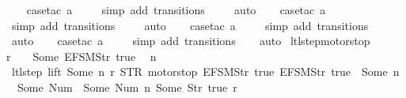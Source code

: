 \begin{isabellebody}
\ \ \isamarkupfalse%
\ {\isacharparenleft}case{\isacharunderscore}tac\ {\isachardoublequoteopen}a{\isacharequal}{}{\isachardoublequoteclose}{\isacharparenright}\isanewline
\ \ \ \isamarkupfalse%
\ {\isacharparenleft}simp\ add{\isacharcolon}\ transitions{\isacharparenright}\isanewline
\ \ \ \isamarkupfalse%
\ auto{\isacharbrackleft}{}{\isacharbrackright}\isanewline
\ \ \isamarkupfalse%
\ {\isacharparenleft}case{\isacharunderscore}tac\ {\isachardoublequoteopen}a{\isacharequal}{}{\isachardoublequoteclose}{\isacharparenright}\isanewline
\ \ \ \isamarkupfalse%
\ {\isacharparenleft}simp\ add{\isacharcolon}\ transitions{\isacharparenright}\isanewline
\ \ \ \isamarkupfalse%
\ auto{\isacharbrackleft}{}{\isacharbrackright}\isanewline
\ \ \isamarkupfalse%
\ {\isacharparenleft}case{\isacharunderscore}tac\ {\isachardoublequoteopen}a{\isacharequal}{}{\isachardoublequoteclose}{\isacharparenright}\isanewline
\ \ \ \isamarkupfalse%
\ {\isacharparenleft}simp\ add{\isacharcolon}\ transitions{\isacharparenright}\isanewline
\ \ \ \isamarkupfalse%
\ auto{\isacharbrackleft}{}{\isacharbrackright}\isanewline
\ \ \isamarkupfalse%
\ {\isacharparenleft}case{\isacharunderscore}tac\ {\isachardoublequoteopen}a{\isacharequal}{}{\isachardoublequoteclose}{\isacharparenright}\isanewline
\ \ \ \isamarkupfalse%
\ {\isacharparenleft}simp\ add{\isacharcolon}\ transitions{\isacharparenright}\isanewline
\ \ \isamarkupfalse%
\ auto%
\endisatagproof
{\isafoldproof}%
%
\isadelimproof
\isanewline
%
\endisadelimproof
\isanewline
{}\isamarkupfalse%
\ ltl{\isacharunderscore}step{\isacharunderscore}motorstop{\isacharcolon}\isanewline
{\isachardoublequoteopen}r\ {\isachardollar}\ {}\ {\isacharequal}\ Some\ {\isacharparenleft}EFSM{\isachardot}Str\ {\isacharprime}{\isacharprime}true{\isacharprime}{\isacharprime}{\isacharparenright}\ {\isasymLongrightarrow}\isanewline
\ n\ {\isasymin}\ {\isacharbraceleft}{}{\isacharcomma}\ {}{\isacharcomma}\ {}{\isacharcomma}\ {}{\isacharbraceright}\ {\isasymLongrightarrow}\isanewline
\ ltl{\isacharunderscore}step\ lift\ {\isacharparenleft}Some\ n{\isacharparenright}\ r\ {\isacharparenleft}STR\ {\isacharprime}{\isacharprime}motorstop{\isacharprime}{\isacharprime}{\isacharcomma}\ {\isacharbrackleft}EFSM{\isachardot}Str\ {\isacharprime}{\isacharprime}true{\isacharprime}{\isacharprime}{\isacharcomma}\ EFSM{\isachardot}Str\ {\isacharprime}{\isacharprime}true{\isacharprime}{\isacharprime}{\isacharbrackright}{\isacharparenright}\ {\isacharequal}\ {\isacharparenleft}Some\ {\isacharparenleft}n\ {\isacharplus}\ {}{\isacharparenright}{\isacharcomma}\ {\isacharbrackleft}Some\ {\isacharparenleft}Num\ {}{\isacharparenright}{\isacharcomma}\ Some\ {\isacharparenleft}Num\ n{\isacharparenright}{\isacharcomma}\ Some\ {\isacharparenleft}Str\ {\isacharprime}{\isacharprime}true{\isacharprime}{\isacharprime}{\isacharparenright}{\isacharbrackright}{\isacharcomma}\ r{\isacharparenright}{\isachardoublequoteclose}\isanewline

\end{isabellebody}
